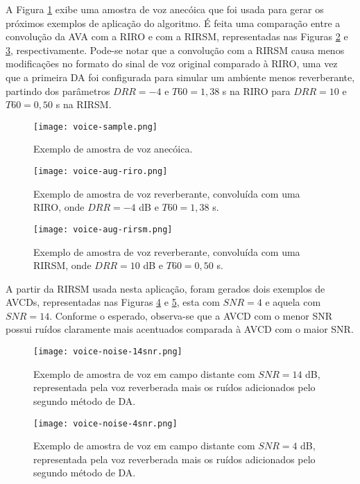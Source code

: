 A Figura \ref{fig:voice-sample} exibe uma amostra de voz anecóica que foi usada para gerar os próximos exemplos de aplicação
do algoritmo. É feita uma comparação entre a convolução da AVA com a RIRO e com a RIRSM, representadas nas Figuras \ref{fig:voice-aug-riro} e 
\ref{fig:voice-aug-rirsm}, respectivamente. Pode-se notar que a convolução com a RIRSM causa menos modificações no formato do sinal de voz original 
comparado à RIRO, uma vez que a primeira DA foi configurada para simular um ambiente menos reverberante, partindo dos parâmetros $DRR=-4$ e $T60=1,38$ s
na RIRO para $DRR=10$ e $T60=0,50$ s na RIRSM.

\begin{figure} [H]
    \centering
    \texttt{[image: voice-sample.png]}
    \caption{Exemplo de amostra de voz anecóica.}
    \label{fig:voice-sample}
\end{figure}  

\begin{figure} [H]
    \centering
    \texttt{[image: voice-aug-riro.png]}
    \caption{Exemplo de amostra de voz reverberante, convoluída com uma RIRO, onde $DRR = -4$ dB e $T60=1,38$ s.}
    \label{fig:voice-aug-riro}
\end{figure} 

\begin{figure} [H]
    \centering
    \texttt{[image: voice-aug-rirsm.png]}
    \caption{Exemplo de amostra de voz reverberante, convoluída com uma RIRSM, onde $DRR = 10$ dB e $T60=0,50$ s.}
    \label{fig:voice-aug-rirsm}
\end{figure} 

A partir da RIRSM usada nesta aplicação, foram gerados dois exemplos de AVCDs, representadas nas Figuras \ref{fig:voice-noise-14snr} e 
\ref{fig:voice-noise-4snr}, esta com $SNR = 4$ e aquela com $SNR = 14$. Conforme o esperado, observa-se que a AVCD com o menor SNR
possui ruídos claramente mais acentuados comparada à AVCD com o maior SNR.

\begin{figure} [H]
    \centering
    \texttt{[image: voice-noise-14snr.png]}
    \caption{Exemplo de amostra de voz em campo distante com $SNR = 14$ dB, representada pela voz reverberada mais os ruídos adicionados pelo segundo método de DA.}
    \label{fig:voice-noise-14snr}
\end{figure} 

\begin{figure} [H]
    \centering
    \texttt{[image: voice-noise-4snr.png]}
    \caption{Exemplo de amostra de voz em campo distante com $SNR = 4$ dB, representada pela voz reverberada mais os ruídos adicionados pelo segundo método de DA.}
    \label{fig:voice-noise-4snr}
\end{figure} 